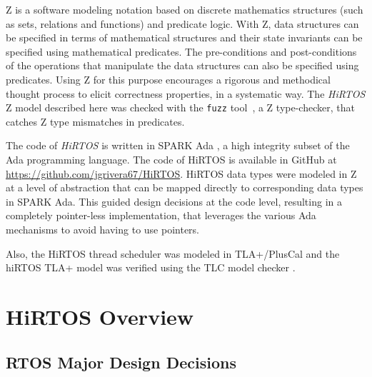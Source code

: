 \documentclass[11pt,letterpaper,twoside,openany]{book}
\begin{document}
Z is a software modeling notation based on discrete mathematics structures (such as sets,
relations and functions) and predicate logic. With Z, data structures can be specified in
terms of mathematical structures and their state invariants can be specified using mathematical
predicates. The pre-conditions and post-conditions of the operations that manipulate
the data structures can also be specified using predicates. Using Z for this purpose encourages
a rigorous and methodical thought process to elicit correctness properties, in a systematic way.
The \emph{HiRTOS} Z model described here was checked with the \verb'fuzz' tool~\cite{Fuzz}, a
Z type-checker, that catches Z type mismatches in predicates.

The code of \emph{HiRTOS} is written in SPARK Ada \cite{SparkAda}, a high integrity
subset of the Ada programming language. The code of HiRTOS is available in GitHub at
\url{https://github.com/jgrivera67/HiRTOS}. HiRTOS data types were modeled in Z at a
level of abstraction that can be mapped directly to corresponding data types in SPARK Ada.
This guided design decisions at the code level, resulting in a completely pointer-less
implementation, that leverages the various Ada mechanisms to avoid having to use pointers.

Also, the HiRTOS thread scheduler was modeled in TLA+/PlusCal \cite{tla1, tla2} and the
hiRTOS TLA+ model was verified using the TLC model checker \cite{tlc}.

\chapter{HiRTOS Overview}

\section{RTOS Major Design Decisions}
\end{document}
